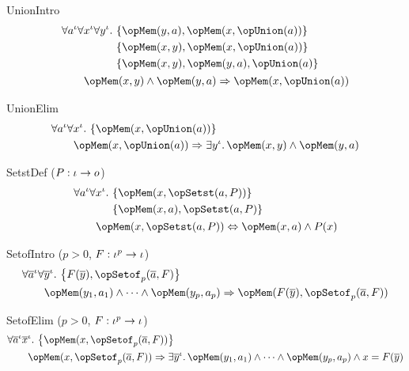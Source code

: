 \documentclass[11pt, a4paper, oneside]{article}
\begin{document}
\begin{axioms}
\item[UnionIntro] \[
        \begin{aligned}
            &\forall a^\idv \forall x^\idv \forall y^\idv.\, \begin{aligned}[t]
                &\st{ \opMem(y, a), \opMem(x, \opUnion(a)) } \\
                &\st{ \opMem(x, y), \opMem(x, \opUnion(a)) } \\
                &\st{ \opMem(x, y), \opMem(y, a), \opUnion(a) }
            \end{aligned} \\
            &\qquad \opMem(x, y) \wedge \opMem(y, a) \imp \opMem(x, \opUnion(a))
        \end{aligned}
    \]

\item[UnionElim] \[
        \begin{aligned}
            &\forall a^\idv \forall x^\idv.\, \st{ \opMem(x, \opUnion(a)) } \\
            &\qquad \opMem(x, \opUnion(a)) \imp \exists y^\idv.\, \opMem(x, y) \wedge \opMem(y, a)
        \end{aligned}
    \]

\item[SetstDef ($P : \iota \rightarrow o$)] \[
        \begin{aligned}
            &\forall a^\idv \forall x^\idv.\, \begin{aligned}[t]
                &\st{ \opMem(x, \opSetst(a, P)) } \\
                &\st{ \opMem(x, a), \opSetst(a, P) }
            \end{aligned} \\
            &\qquad \opMem(x, \opSetst(a, P)) \eqv \opMem(x, a) \wedge P(x)
        \end{aligned}
    \]

\item[SetofIntro ($p > 0$, $F : \iota^p \rightarrow \iota$)] \[
        \begin{aligned}
            &\forall \overline{a}^\idv \forall \overline{y}^\idv.\, \st{ F(\overline{y}), \opSetof_p(\overline{a}, F) } \\
            &\qquad \opMem(y_1, a_1) \wedge \dots \wedge \opMem(y_p, a_p) \imp \opMem(F(\overline{y}), \opSetof_p(\overline{a}, F))
        \end{aligned}
    \]

\item[SetofElim ($p > 0$, $F : \iota^p \rightarrow \iota$)] \[
        \begin{aligned}
            &\forall \overline{a}^\idv \overline{x}^\idv.\, \st{ \opMem(x, \opSetof_p(\overline{a}, F)) } \\
            &\qquad \opMem(x, \opSetof_p(\overline{a}, F)) \imp \exists \overline{y}^\idv.\, \opMem(y_1, a_1) \wedge \dots \wedge \opMem(y_p, a_p) \wedge x = F(\overline{y})
        \end{aligned}
    \]


\end{axioms}
\end{document}
